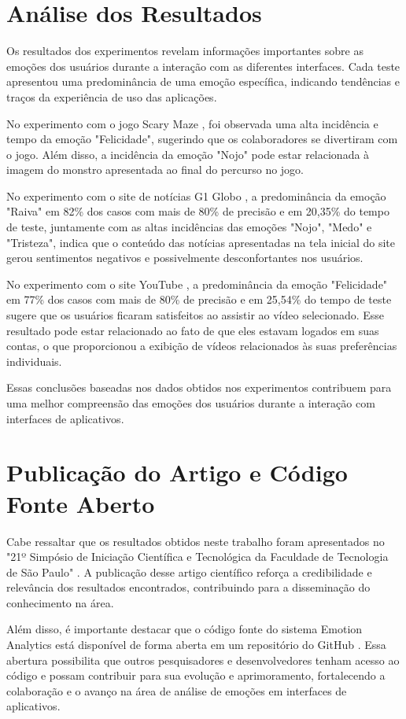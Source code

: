 \section{Análise dos Resultados}

Os resultados dos experimentos revelam informações importantes sobre as emoções dos usuários durante a interação com as diferentes interfaces. Cada teste apresentou uma predominância de uma emoção específica, indicando tendências e traços da experiência de uso das aplicações.

No experimento com o jogo Scary Maze \cite{18}, foi observada uma alta incidência e tempo da emoção "Felicidade", sugerindo que os colaboradores se divertiram com o jogo. Além disso, a incidência da emoção "Nojo" pode estar relacionada à imagem do monstro apresentada ao final do percurso no jogo.

No experimento com o site de notícias G1 Globo \cite{19}, a predominância da emoção "Raiva" em 82\% dos casos com mais de 80\% de precisão e em 20,35\% do tempo de teste, juntamente com as altas incidências das emoções "Nojo", "Medo" e "Tristeza", indica que o conteúdo das notícias apresentadas na tela inicial do site gerou sentimentos negativos e possivelmente desconfortantes nos usuários.

No experimento com o site YouTube \cite{20}, a predominância da emoção "Felicidade" em 77\% dos casos com mais de 80\% de precisão e em 25,54\% do tempo de teste sugere que os usuários ficaram satisfeitos ao assistir ao vídeo selecionado. Esse resultado pode estar relacionado ao fato de que eles estavam logados em suas contas, o que proporcionou a exibição de vídeos relacionados às suas preferências individuais.

Essas conclusões baseadas nos dados obtidos nos experimentos contribuem para uma melhor compreensão das emoções dos usuários durante a interação com interfaces de aplicativos.

\section{Publicação do Artigo e Código Fonte Aberto}

Cabe ressaltar que os resultados obtidos neste trabalho foram apresentados no "21º Simpósio de Iniciação Científica e Tecnológica da Faculdade de Tecnologia de São Paulo" \cite{25}. A publicação desse artigo científico reforça a credibilidade e relevância dos resultados encontrados, contribuindo para a disseminação do conhecimento na área.

Além disso, é importante destacar que o código fonte do sistema Emotion Analytics está disponível de forma aberta em um repositório do GitHub \cite{22}\cite{23}. Essa abertura possibilita que outros pesquisadores e desenvolvedores tenham acesso ao código e possam contribuir para sua evolução e aprimoramento, fortalecendo a colaboração e o avanço na área de análise de emoções em interfaces de aplicativos.
